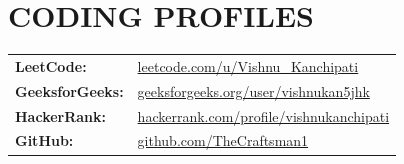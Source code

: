 \documentclass[10pt, letterpaper]{article}
\begin{document}
\section{CODING PROFILES}
\begin{tabularx}{\linewidth}{@{}l X@{}}
    \textbf{LeetCode:} & \href{https://leetcode.com/u/Vishnu_Kanchipati/}{leetcode.com/u/Vishnu\_Kanchipati} \\
    \textbf{GeeksforGeeks:} & \href{https://www.geeksforgeeks.org/user/vishnukan5jhk/}{geeksforgeeks.org/user/vishnukan5jhk} \\
    \textbf{HackerRank:} & \href{https://www.hackerrank.com/profile/vishnukanchipati}{hackerrank.com/profile/vishnukanchipati} \\
    \textbf{GitHub:} & \href{https://github.com/TheCraftsman1}{github.com/TheCraftsman1} \\
\end{tabularx}
\end{document}
